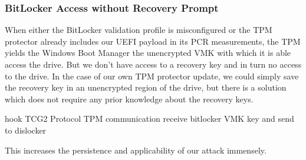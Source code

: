 \subsubsection{BitLocker Access without Recovery Prompt}


When either the BitLocker validation profile is misconfigured or the \ac{TPM} protector already includes our \ac{UEFI} payload in its \ac{PCR} measurements, the \ac{TPM} yields the Windows Boot Manager the unencrypted \ac{VMK} with which it is able access the drive.
But we don't have access to a recovery key and in turn no access to the drive.
In the case of our own \ac{TPM} protector update, we could simply save the recovery key in an unencrypted region of the drive, but there is a solution which does not require any prior knowledge about the recovery keys.

hook \ac{TCG}2 Protocol \cite[6.7.3]{tcg-efi-protocol-spec}
\ac{TPM} communication
receive bitlocker \ac{VMK} key and send to dislocker
\cite{bde-format-spec}
\cite{tpm-sniffing}

This increases the persistence and applicability of our attack immensely.